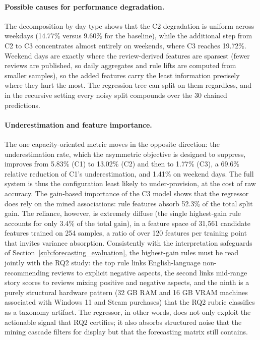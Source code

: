 \paragraph{Possible causes for performance degradation.} The decomposition by day type shows that the C2 degradation is uniform across weekdays (14.77\% versus 9.60\% for the baseline), while the additional step from C2 to C3 concentrates almost entirely on weekends, where C3 reaches 19.72\%. Weekend days are exactly where the review-derived features are sparsest (fewer reviews are published, so daily aggregates and rule lifts are computed from smaller samples), so the added features carry the least information precisely where they hurt the most. The regression tree can split on them regardless, and in the recursive setting every noisy split compounds over the 30 chained predictions.

\paragraph{Underestimation and feature importance.} The one capacity-oriented metric moves in the opposite direction: the underestimation rate, which the asymmetric objective is designed to suppress, improves from 5.83\% (C1) to 13.02\% (C2) and then to 1.77\% (C3), a 69.6\% relative reduction of C1's underestimation, and 1.41\% on weekend days. The full system is thus the configuration least likely to under-provision, at the cost of raw accuracy. The gain-based importance of the C3 model shows that the regressor does rely on the mined associations: rule features absorb 52.3\% of the total split gain. The reliance, however, is extremely diffuse (the single highest-gain rule accounts for only 3.4\% of the total gain), in a feature space of 31{,}561 candidate features trained on 254 samples, a ratio of over 120 features per training point that invites variance absorption. Consistently with the interpretation safeguards of Section~\ref{sub:forecasting_evaluation}, the highest-gain rules must be read jointly with the RQ2 study: the top rule links English-language non-recommending reviews to explicit negative aspects, the second links mid-range story scores to reviews mixing positive and negative aspects, and the ninth is a purely structural hardware pattern (32 GB RAM and 16 GB VRAM machines associated with Windows 11 and Steam purchases) that the RQ2 rubric classifies as a taxonomy artifact. The regressor, in other words, does not only exploit the actionable signal that RQ2 certifies; it also absorbs structured noise that the mining cascade filters for display but that the forecasting matrix still contains.

